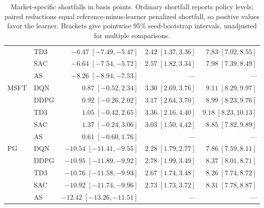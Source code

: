 \begin{table}[!htbp]
\begin{tabular}{@{}llrrr@{}}
 & TD3 & $-6.47\;[-7.49,-5.47]$ & $2.42\;[1.37,3.36]$ & $7.83\;[7.02,8.55]$ \\
 & SAC & $-6.64\;[-7.54,-5.72]$ & $2.57\;[1.82,3.34]$ & $7.98\;[7.39,8.49]$ \\
 & AS & $-8.26\;[-8.94,-7.53]$ & --- & --- \\
\addlinespace[5pt]
MSFT & DQN & $0.87\;[-0.52,2.34]$ & $3.30\;[2.69,3.76]$ & $9.11\;[8.29,9.97]$ \\
 & DDPG & $0.92\;[-0.26,2.02]$ & $3.17\;[2.64,3.70]$ & $8.99\;[8.23,9.76]$ \\
 & TD3 & $1.05\;[-0.42,2.65]$ & $3.36\;[2.16,4.40]$ & $9.18\;[8.23,10.13]$ \\
 & SAC & $1.37\;[-0.24,3.06]$ & $3.03\;[1.50,4.42]$ & $8.85\;[7.82,9.89]$ \\
 & AS & $0.61\;[-0.60,1.76]$ & --- & --- \\
\addlinespace[5pt]
PG & DQN & $-10.54\;[-11.41,-9.55]$ & $2.28\;[1.79,2.77]$ & $7.86\;[7.59,8.11]$ \\
 & DDPG & $-10.95\;[-11.89,-9.92]$ & $2.78\;[1.99,3.49]$ & $8.37\;[8.01,8.71]$ \\
 & TD3 & $-10.76\;[-11.58,-9.93]$ & $2.67\;[1.74,3.48]$ & $8.26\;[7.74,8.72]$ \\
 & SAC & $-10.92\;[-11.74,-9.96]$ & $2.73\;[1.73,3.72]$ & $8.31\;[7.78,8.87]$ \\
 & AS & $-12.42\;[-13.26,-11.51]$ & --- & --- \\
\bottomrule
\end{tabular}
\caption{Market-specific shortfalls in basis points. Ordinary shortfall reports policy levels; paired reductions equal reference-minus-learner penalized shortfall, so positive values favor the learner. Brackets give pointwise 95\% seed-bootstrap intervals, unadjusted for multiple comparisons.}
\label{tab:benchmark_supplement}
\end{table}
